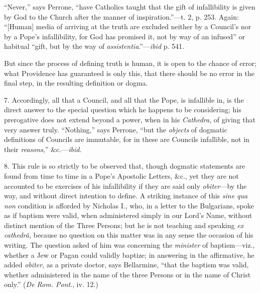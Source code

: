 ``Never,'' says Perrone, ``have Catholics taught that the
gift of infallibility is given by God to the Church after the manner of
inspiration.''—t. 2, p. 253. Again: ``[Human] media of
arriving at the truth are excluded neither by a Council's nor by a
Pope's infallibility, for God has promised it, not by way of an
infused'' or habitual ``gift, but by the way of \emph{assistentia}.''—\emph{ibid}
p. 541.

But since the process of defining truth is human, it is open to the
chance of error; what Providence has guaranteed is only this, that there
should be no error in the final step, in the resulting definition or
dogma.

7. Accordingly, all that a Council, and all that the Pope, is
infallible in, is the direct answer to the special question which
he happens to be considering; his prerogative does not extend beyond a
power, when in his \emph{Cathedra}, of giving that very answer truly.
``Nothing,'' says Perrone, ``but the \emph{objects} of
dogmatic definitions of Councils are immutable, for in these are
Councils infallible, not in their \emph{reasons},'' \&c.—\emph{ibid}.

8. This rule is so strictly to be observed that, though dogmatic
statements are found from time to time in a Pope's Apostolic Letters,
\&c., yet they are not accounted to be exercises of his infallibility
if they are said only \emph{obiter}—by the way, and without direct
intention to define. A striking instance of this \emph{sine qua non}
condition is afforded by Nicholas I., who, in a letter to the
Bulgarians, spoke as if baptism were valid, when administered simply in
our Lord's Name, without distinct mention of the Three Persons; but he
is not teaching and speaking \emph{ex cathedrâ}, because no question on
this matter was in any sense the occasion of his writing. The question
asked of him was concerning the \emph{minister} of baptism—viz.,
whether a Jew or Pagan could validly baptize; in answering in the
affirmative, he added \emph{obiter}, as a private doctor, says
Bellarmine, ``that the baptism was valid, whether administered in
the name of the three Persons or in the name of Christ only.'' (\emph{De
Rom. Pont}., iv. 12.)

